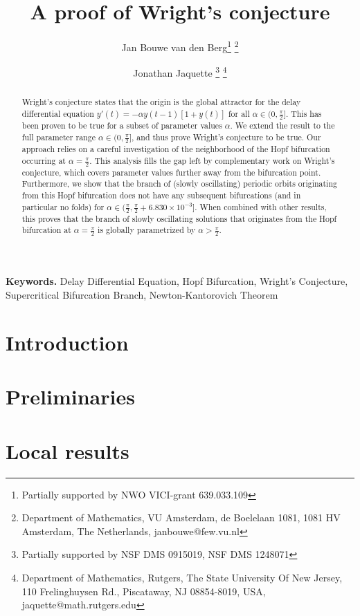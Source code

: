 \documentclass{article}
\title{A proof of Wright's conjecture}
\author{Jan Bouwe van den Berg\thanks{Partially supported by NWO VICI-grant 639.033.109} \thanks{Department of Mathematics, VU Amsterdam, de Boelelaan 1081, 1081 HV Amsterdam, The Netherlands, janbouwe@few.vu.nl}
\and
Jonathan Jaquette \thanks{Partially supported by NSF DMS 0915019,	NSF DMS 1248071} \thanks{Department of Mathematics, Rutgers, The State University Of New Jersey, 110 Frelinghuysen Rd., Piscataway, NJ 08854-8019, USA, jaquette@math.rutgers.edu}
}
\numberwithin{equation}{section}
\newcommand{\pp}{\tfrac{\pi}{2}}
\begin{document}
\maketitle



\begin{abstract}
Wright's conjecture states that the origin is the global attractor for the delay differential equation $y'(t) = - \alpha y(t-1) [ 1 + y(t) ] $  for all $\alpha \in (0,\pp]$. This has been proven to be true for a subset of parameter values $\alpha$. We extend the result to the full parameter range $\alpha \in (0,\pp]$, and thus prove Wright's conjecture to be true. Our approach relies on a careful investigation of the neighborhood of the Hopf bifurcation occurring at $\alpha = \pp$. This analysis fills the gap left by complementary work on Wright's conjecture, which covers parameter values further away from the bifurcation point. Furthermore, we show that the branch of (slowly oscillating) periodic orbits originating from this Hopf bifurcation does not have any subsequent bifurcations (and in particular no folds) for
$\alpha\in(\pp , \pp + 6.830 \times10^{-3}]$. 
When combined with other results, this proves that the branch of slowly oscillating solutions that originates from the Hopf bifurcation at $\alpha=\pp$ is globally parametrized by $\alpha > \pp$.
\end{abstract}



\begin{center}
	{\bf \small Keywords.} 
	{ \small Delay Differential Equation,
		Hopf Bifurcation, 
		Wright's Conjecture, \\
		Supercritical Bifurcation Branch,
		Newton-Kantorovich Theorem
		}
\end{center}

\section{Introduction}
\label{s:introduction}


\section{Preliminaries}
\label{s:preliminaries}


\section{Local results}
\label{s:local}

\end{document}
